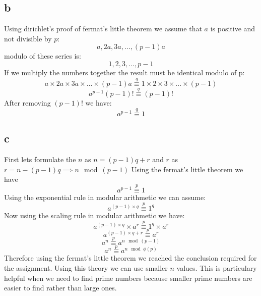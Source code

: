 \documentclass[a4paper, 11pt]{article}
\begin{document}
\subsection{b}
Using dirichlet's proof of fermat's little theorem we assume that $a$ is
positive and not divisible by $p$:
\begin{equation}
    a,2a,3a, ..., (p-1)a
\end{equation}
modulo of these series is:
\begin{equation}
    1, 2, 3, ..., p-1
\end{equation}
If we multiply the numbers together the result must be identical modulo of p:
\begin{equation}
    a \times 2a \times 3a \times ... \times (p-1)a \stackrel{q}{\equiv} 1
    \times 2 \times 3 \times ... \times (p-1)
\end{equation}
\begin{equation}
    a^{p-1}(p-1)! \stackrel{q}{\equiv} (p-1)!
\end{equation}
After removing $(p-1)!$ we have:
\begin{equation}
    a^{p-1} \stackrel{q}{\equiv} 1
\end{equation}
\subsection{c}
First lets formulate the $n$ as $n = (p-1)q + r$ and $r$ as $ r = n - (p-1)q
\implies n \mod (p-1)$
Using the fermat's little theorem we have
\begin{equation}
    a^{p-1} \stackrel{p}{\equiv} 1
\end{equation}
Using the exponential rule in modular arithmetic we can assume:
\begin{equation}
    a^{(p-1) \times q} \stackrel{p}{\equiv} 1^{q}
\end{equation}
Now using the scaling rule in modular arithmetic we have:
\begin{equation}
    a^{(p-1) \times q} \times a^{r} \stackrel{p}{\equiv} 1^{q} \times a^{r}
\end{equation}
\begin{equation}
    a^{(p-1) \times q + r} \stackrel{p}{\equiv} a^{r}
\end{equation}
\begin{equation}
    a^{n} \stackrel{p}{\equiv} a^{n \mod (p-1)}
\end{equation}
\begin{equation}
    a^{n} \stackrel{p}{\equiv} a^{n \mod \phi(p)}
\end{equation}
Therefore using the fermat's little theorem we reached the conclusion required
for the assignment. Using this theory we can use smaller $n$ values. This is
particulary helpful when we need to find prime numbers because smaller prime
numbers are easier to find rather than large ones.
\end{document}
